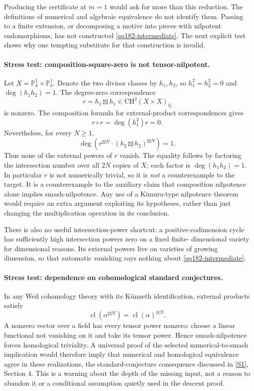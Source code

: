 \documentclass[11pt,a4paper]{article}
\newcommand{\Q}{\mathbb{Q}}
\newcommand{\PP}{\mathbb P}
\newcommand{\sref}[2]{\hyperlink{source:#1:#2}{[S#2]}}
\numberwithin{equation}{section}
\begin{document}
Producing the certificate at $m=1$ would ask for more than this reduction.
The definitions of numerical and algebraic equivalence do not identify
them. Passing to a finite extension, or decomposing a motive into pieces
with nilpotent endomorphisms, has not constructed
\eqref{eq182-intermediate}. The next explicit test shows why one tempting
substitute for that construction is invalid.

\paragraph{Stress test: composition-square-zero is not tensor-nilpotent.}
Let $X=\PP^1_k\times\PP^1_k$. Denote the two divisor classes by $h_1,h_2$,
so $h_1^2=h_2^2=0$ and $\deg(h_1h_2)=1$. The degree-zero correspondence
\[
                 r=h_1\boxtimes h_1
                         \in\mathrm{CH}^2(X\times X)_{\Q}
\]
is nonzero. The composition formula for external-product correspondences
gives
\[
                    r\circ r=\deg(h_1^2)r=0.
\]
Nevertheless, for every $N\ge1$,
\begin{equation}\label{eq182-notensor}
 \deg\left(r^{\boxtimes N}\cdot
                      (h_2\boxtimes h_2)^{\boxtimes N}\right)=1.
\end{equation}
Thus none of the external powers of $r$ vanish. The equality follows by
factoring the intersection number over all $2N$ copies of $X$; each factor
is $\deg(h_1h_2)=1$. In particular $r$ is not numerically trivial, so it is
\emph{not} a counterexample to the target. It is a counterexample to the
auxiliary claim that composition nilpotence alone implies smash-nilpotence.
Any use of a Kimura-type nilpotence theorem would require an extra argument
exploiting its hypotheses, rather than just changing the multiplication
operation in its conclusion.

There is also no useful intersection-power shortcut: a positive-codimension
cycle has sufficiently high intersection powers zero on a fixed finite-
dimensional variety for dimensional reasons. Its external powers live on
varieties of growing dimension, so that automatic vanishing says nothing
about \eqref{eq182-intermediate}.

\paragraph{Stress test: dependence on cohomological standard conjectures.}
In any Weil cohomology theory with its K\"unneth identification, external
products satisfy
\[
 \operatorname{cl}(\alpha^{\boxtimes N})
                      =\operatorname{cl}(\alpha)^{\otimes N}.
\]
A nonzero vector over a field has every tensor power nonzero: choose a
linear functional not vanishing on it and take its tensor power. Hence
smash-nilpotence forces homological triviality. A universal proof of the
selected numerical-to-smash implication would therefore imply that
numerical and homological equivalence agree in these realizations, the
standard-conjecture consequence discussed in \sref{30006776}{1}, Section 4.
This is a warning about the depth of the missing input, not a reason to
abandon it or a conditional assumption quietly used in the descent proof.
\end{document}
